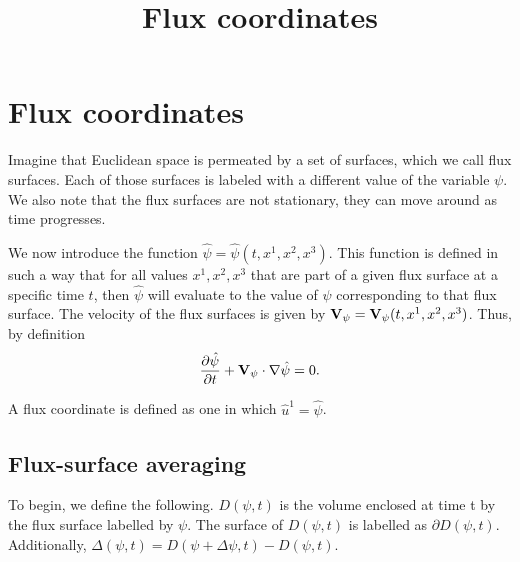 \documentclass[11pt]{article}
\title{Flux coordinates}
\begin{document}
\maketitle

\section{Flux coordinates}
Imagine that Euclidean space is permeated by a set of surfaces, which we call flux surfaces. Each of those surfaces is labeled with a different value of the variable $\psi$. We also note that the flux surfaces are not stationary, they can move around as time progresses.

We now introduce the function $\hat{\psi} = \hat{\psi}(t,x^1,x^2,x^3)$. This function is defined in such a way that for all values $x^1,x^2,x^3$ that are part of a given flux surface at a specific time $t$, then $\hat{\psi}$ will evaluate to the value of $\psi$ corresponding to that flux surface. The velocity of the flux surfaces is given by $\mathbf{V}_\psi = \mathbf{V}_\psi(t,x^1,x^2,x^3)$. Thus, by definition
\begin{equation}
\label{eq:cons_flux_surf}
    \frac{\partial \hat{\psi}}{\partial t} + \mathbf{V}_\psi \cdot \nabla \hat{\psi} = 0.
\end{equation}

A flux coordinate is defined as one in which $\hat{u}^1 = \hat{\psi}$.


\subsection{Flux-surface averaging}
To begin, we define the following. $D(\psi,t)$ is the volume enclosed at time t by the flux surface labelled by $\psi$. The surface of $D(\psi,t)$ is labelled as $\partial D(\psi,t)$. Additionally, $\Delta(\psi,t) = D(\psi + \Delta \psi,t) - D(\psi,t)$.
\end{document}
